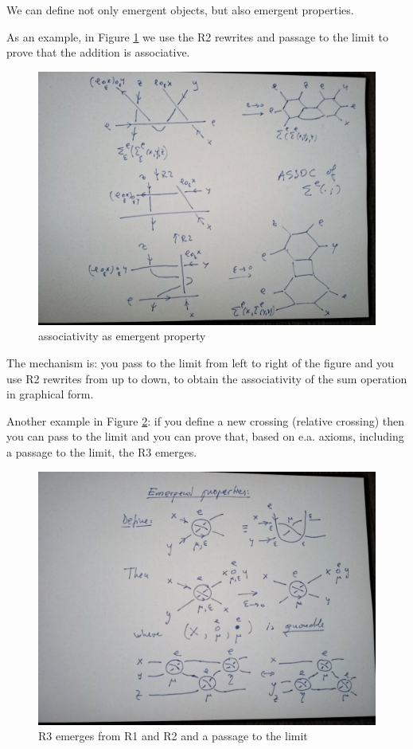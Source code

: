 \documentclass[]{article}
\begin{document}
We can define not only emergent objects, but also emergent properties.

As an example, in Figure \ref{associativity-as-emergent-property} we use the R2 rewrites and passage to the limit
to prove that the addition is associative.

\begin{figure}[h!]
\centering
\includegraphics[width=0.75\linewidth]{img/2715.jpg}
\caption{associativity as emergent property}
\label{associativity-as-emergent-property}
\end{figure}

The mechanism is: you pass to the limit from left to right of the figure and
you use R2 rewrites from up to down, to obtain the associativity of the
sum operation in graphical form.

Another example in Figure \ref{R3-emerges-from-R1-and-R2}: if you define a new crossing (relative crossing) then
you can pass to the limit and you can prove that, based on e.a. axioms,
including a passage to the limit, the R3 emerges.

\begin{figure}[h!]
\centering
\includegraphics[width=0.75\linewidth]{img/2734.jpg}
\caption{R3 emerges from R1 and R2 and a passage to the limit}
\label{R3-emerges-from-R1-and-R2}
\end{figure}
\end{document}
